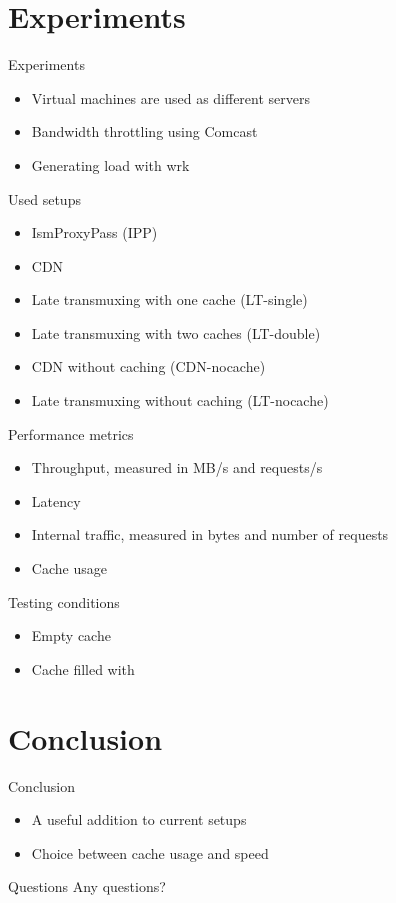 \documentclass[xcolor=svgnames,handout]{beamer}
\begin{document}
\section{Experiments}
\begin{frame}{Experiments}
    \begin{itemize}
        \item Virtual machines are used as different servers
        \item Bandwidth throttling using Comcast
        \item Generating load with wrk
    \end{itemize}
\end{frame}

\begin{frame}{Used setups}
    \begin{itemize}
        \item IsmProxyPass (IPP)
        \item CDN
        \item Late transmuxing with one cache (LT-single)
        \item Late transmuxing with two caches (LT-double)
        \item CDN without caching (CDN-nocache)
        \item Late transmuxing without caching (LT-nocache)
    \end{itemize}
\end{frame}

\begin{frame}{Performance metrics}
    \begin{itemize}
        \item Throughput, measured in MB/s and requests/s
        \item Latency
        \item Internal traffic, measured in bytes and number of requests
        \item Cache usage
    \end{itemize}
\end{frame}


\begin{frame}{Testing conditions}
    \begin{itemize}
        \item Empty cache
        \item Cache filled with
    \end{itemize}
\end{frame}

\section{Conclusion}

\begin{frame}{Conclusion}
  \begin{itemize}
      \item A useful addition to current setups
      \item Choice between cache usage and speed
  \end{itemize}
\end{frame}


\begin{frame}{Questions}
    Any questions?


\end{frame}
\end{document}
